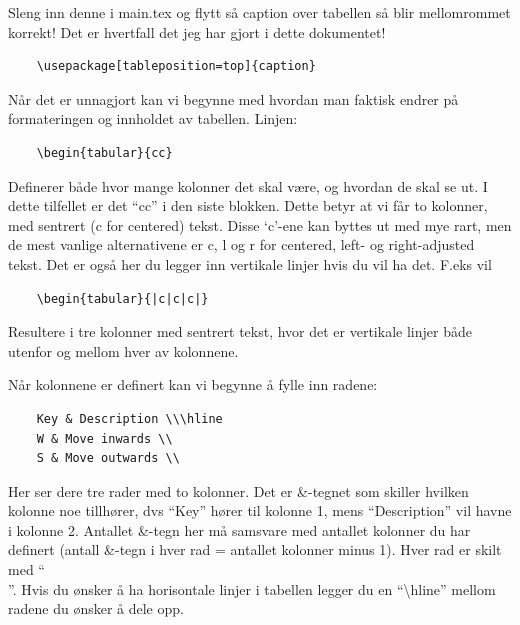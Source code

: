         Sleng inn denne i main.tex og flytt så caption over tabellen så blir mellomrommet korrekt! Det er hvertfall det jeg har gjort i dette dokumentet!
        \begin{verbatim}
    \usepackage[tableposition=top]{caption}
        \end{verbatim}
        
        Når det er unnagjort kan vi begynne med hvordan man faktisk endrer på formateringen og innholdet av tabellen. Linjen:
        \begin{verbatim}
    \begin{tabular}{cc}      
        \end{verbatim}
        Definerer både hvor mange kolonner det skal være, og hvordan de skal se ut. I dette tilfellet er det ``cc'' i den siste blokken. Dette betyr at vi får to kolonner, med sentrert (c for centered) tekst. Disse `c'-ene kan byttes ut med mye rart, men de mest vanlige alternativene er c, l og r for centered, left- og right-adjusted tekst. Det er også her du legger inn vertikale linjer hvis du vil ha det. F.eks vil
        \begin{verbatim}
    \begin{tabular}{|c|c|c|}
        \end{verbatim}
        Resultere i tre kolonner med sentrert tekst, hvor det er vertikale linjer både utenfor og mellom hver av kolonnene. 
        
        Når kolonnene er definert kan vi begynne å fylle inn radene:
        \begin{verbatim}
    Key & Description \\\hline
    W & Move inwards \\
    S & Move outwards \\
        \end{verbatim}
        Her ser dere tre rader med to kolonner. Det er \&-tegnet som skiller hvilken kolonne noe tillhører, dvs ``Key'' hører til kolonne 1, mens ``Description'' vil havne i kolonne 2. Antallet \&-tegn her må samsvare med antallet kolonner du har definert (antall \&-tegn i hver rad = antallet kolonner minus 1). Hver rad er skilt med ``\\''. Hvis du ønsker å ha horisontale linjer i tabellen legger du en ``\textbackslash hline'' mellom radene du ønsker å dele opp.
    
